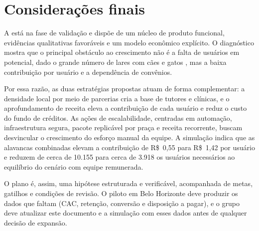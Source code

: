 \section{Considerações finais}
\label{sec:consideracoes}

A \projeto{} está na fase de validação e dispõe de um núcleo de produto funcional, evidências qualitativas favoráveis e um modelo econômico explícito. O diagnóstico mostra que o principal obstáculo ao crescimento não é a falta de usuários em potencial, dado o grande número de lares com cães e gatos \cite{correio2020}, mas a baixa contribuição por usuário e a dependência de convênios.

Por essa razão, as duas estratégias propostas atuam de forma complementar: a densidade local por meio de parcerias cria a base de tutores e clínicas, e o aprofundamento de receita eleva a contribuição de cada usuário e reduz o custo do fundo de créditos. As ações de escalabilidade, centradas em automação, infraestrutura segura, pacote replicável por praça e receita recorrente, buscam desvincular o crescimento do esforço manual da equipe. A simulação indica que as alavancas combinadas elevam a contribuição de R\$~0,55 para R\$~1,42 por usuário e reduzem de cerca de 10.155 para cerca de 3.918 os usuários necessários ao equilíbrio do cenário com equipe remunerada.

O plano é, assim, uma hipótese estruturada e verificável, acompanhada de metas, gatilhos e condições de revisão. O piloto em Belo Horizonte deve produzir os dados que faltam (CAC, retenção, conversão e disposição a pagar), e o grupo deve atualizar este documento e a simulação com esses dados antes de qualquer decisão de expansão.
